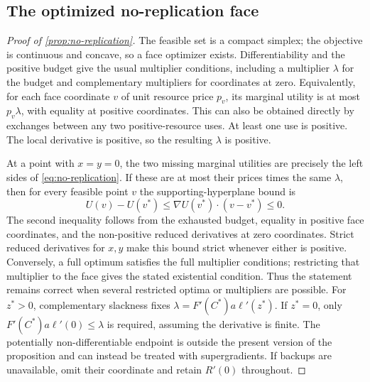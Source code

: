 \subsection{The optimized no-replication face}
\label{app:replication-proof}
\begin{proof}[Proof of \cref{prop:no-replication}]
The feasible set is a compact simplex; the objective is continuous and
concave, so a face optimizer exists. Differentiability and the positive
budget give the usual multiplier conditions, including a multiplier
$\lambda$ for the budget and complementary multipliers for coordinates
at zero. Equivalently, for each face coordinate $v$ of unit resource
price $p_v$, its marginal utility is at most $p_v\lambda$, with equality
at positive coordinates. This can also be obtained directly by exchanges
between any two positive-resource uses. At least one use is positive.
The local derivative is positive, so the resulting $\lambda$ is positive.

At a point with $x=y=0$, the two missing marginal utilities are precisely
the left sides of \cref{eq:no-replication}. If these are at most their
prices times the same $\lambda$, then for every feasible point $v$ the
supporting-hyperplane bound is
\[
 U(v)-U(v^*)\leq\nabla U(v^*)\cdot(v-v^*)\leq0.
\]
The second inequality follows from the exhausted budget, equality in
positive face coordinates, and the non-positive reduced derivatives at
zero coordinates. Strict reduced derivatives for $x,y$ make this bound
strict whenever either is positive. Conversely, a full optimum satisfies
the full multiplier conditions; restricting that multiplier to the face
gives the stated existential condition. Thus the statement remains
correct when several restricted optima or multipliers are possible.
For $z^*>0$, complementary slackness fixes
$\lambda=F'(C^*)a\ell'(z^*)$. If $z^*=0$, only
$F'(C^*)a\ell'(0)\leq\lambda$ is required, assuming the derivative is
finite. The potentially non-differentiable endpoint is outside the
present version of the proposition and can instead be treated with
supergradients. If backups are unavailable, omit their coordinate and
retain $R'(0)$ throughout.
\end{proof}


